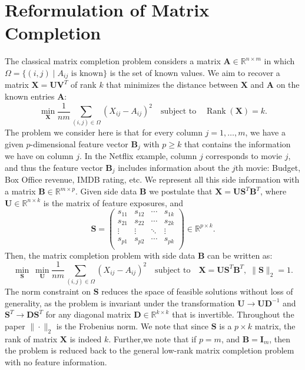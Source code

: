 \documentclass[twoside,11pt]{article}
\newcommand{\md}[1]{\mathbb{#1}}
\DeclareMathOperator\rank{Rank}
\begin{document}
\section{Reformulation of Matrix Completion}
\label{sec:mc_separable}
The classical  matrix completion problem considers a matrix $\bm{A} \in \md{R}^{n\times m}$ in which $\Omega=\{(i,j) \; |\; A_{ij}\text{ is known}\}$ is the set of known values. We aim to recover a matrix $\bm{X}=\bm{U}\bm{V}^T$ of  rank $k$ that minimizes the 
distance between  $\bm{X}$ and $\bm{A}$ on the known entries $\bm{A}$:
\begin{equation*}
\min_{\bm{X}} \frac{1}{nm} \sum_{(i,j) \in \Omega} (X_{ij}-A_{ij})^2  \quad \text{subject to} \quad \rank(\bm{X})=k.
\end{equation*}
The problem we consider here is that for every column  $j=1,\ldots, m$, we have a given  $p$-dimensional feature vector $\bm{B}_j$  with $p\geq k$  that contains 
the information we have on column $j$. In the Netflix  example, column $j$ corresponds to movie $j$, and thus the feature vector $\bm{B}_j$  includes information 
about the $j$th movie: Budget,  Box Office revenue, IMDB rating, etc. We represent all this side information with a matrix $\bm{B} \in \md{R}^{m \times p}$. 
Given side data $\bm{B}$ we postulate that $\bm{X}=\bm{U}\bm{S}^T\bm{B}^T$, where $\bm{U} \in \md{R}^{n \times k}$ is the matrix of feature exposures, and 
\begin{equation*}
\bm{S}=\begin{pmatrix}
s_{11} & s_{12} & \cdots & s_{1k}\\
s_{21} & s_{22} & \cdots & s_{2k}\\
\vdots & \vdots & \ddots & \vdots\\
s_{p1} & s_{p2} & \cdots & s_{pk}\\
\end{pmatrix} \in \md{R}^{p \times k}.
\end{equation*}
Then, the matrix completion problem with side data $\bm{B}$ can be written as:
\begin{equation*}
\min_{\bm{S}} ~\min_{\bm{U}}\frac{1}{nm} \sum_{(i,j) \in \Omega} (X_{ij}-A_{ij})^2  \quad \text{subject to} \quad \bm{X}=\bm{U}\bm{S}^T\bm{B}^T,\; \|\bm{S}\|_2=1.
\end{equation*}
The norm constraint on $\bm{S}$ reduces the space of feasible solutions without loss of generality, as the problem is invariant under the transformation $\bm{U} \to \bm{U}\bm{D}^{-1}$ and $\bm{S}^T \to \bm{D}\bm{S}^T$ for any diagonal matrix $\bm{D} \in \md{R}^{k\times k}$ that is invertible.  Throughout the paper  $\|\cdot\|_2$ is   the Frobenius norm. We note that since $\bm{S}$ is a $p\times k$ matrix, the rank of matrix $\bm{X}$ is indeed $k$. Further,we note that if $p=m$, and $\bm{B}=\bm{I}_m$, then the problem is reduced back to the general low-rank matrix completion problem with no feature information.
\end{document}
